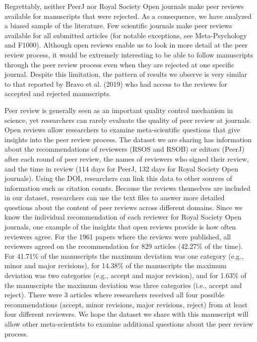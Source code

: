 \documentclass[
  english,
  ,jou, a4paper,floatsintext]{apa6}
\begin{document}
Regrettably, neither PeerJ nor Royal Society Open journals make peer reviews available for manuscripts that were rejected. As a consequence, we have analyzed a biased sample of the literature. Few scientific journals make peer reviews available for all submitted articles (for notable exceptions, see Meta-Psychology and F1000). Although open reviews enable us to look in more detail at the peer review process, it would be extremely interesting to be able to follow manuscripts through the peer review process even when they are rejected at one specific journal. Despite this limitation, the pattern of results we observe is very similar to that reported by Bravo et al. (2019) who had access to the reviews for accepted and rejected manuscripts.

Peer review is generally seen as an important quality control mechanism in science, yet researchers can rarely evaluate the quality of peer review at journals. Open reviews allow researchers to examine meta-scientific questions that give insights into the peer review process. The dataset we are sharing has information about the recommendations of reviewers (RSOS and RSOB) or editors (PeerJ) after each round of peer review, the names of reviewers who signed their review, and the time in review (114 days for PeerJ, 132 days for Royal Society Open journals). Using the DOI, researchers can link this data to other sources of information such as citation counts. Because the reviews themselves are included in our dataset, researchers can use the text files to answer more detailed questions about the content of peer reviews across different domains. Since we know the individual recommendation of each reviewer for Royal Society Open journals, one example of the insights that open reviews provide is how often reviewers agree. For the 1961 papers where the reviews were published, all reviewers agreed on the recommendation for 829 articles (42.27\% of the time). For 41.71\% of the manuscripts the maximum deviation was one category (e.g., minor and major revisions), for 14.38\% of the manuscripts the maximum deviation was two categories (e.g., accept and major revision), and for 1.63\% of the manuscripts the maximum deviation was three categories (i.e., accept and reject). There were 3 articles where researchers received all four possible recommendations (accept, minor revisions, major revisions, reject) from at least four different reviewers. We hope the dataset we share with this manuscript will allow other meta-scientists to examine additional questions about the peer review process.
\end{document}
